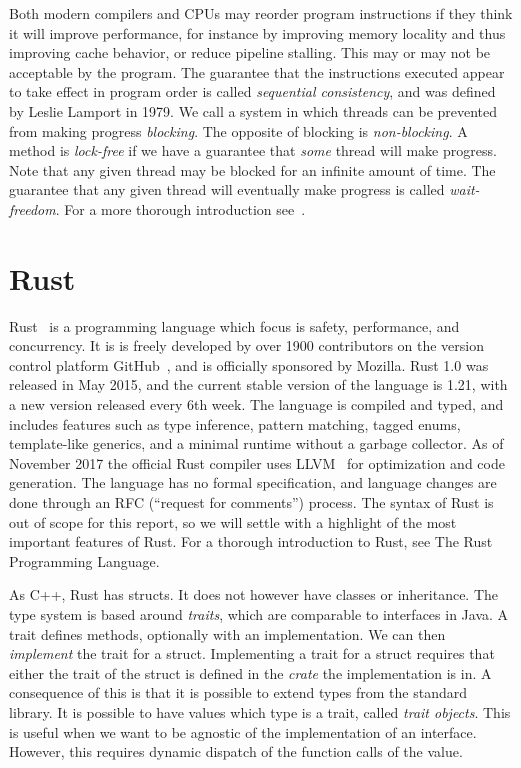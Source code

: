 \documentclass[b5paper]{report}
\begin{document}
Both modern compilers and CPUs may reorder program instructions if they think
it will improve performance, for instance by improving memory locality and thus
improving cache behavior, or reduce pipeline stalling. This may or may not be
acceptable by the program. The guarantee that the instructions executed appear
to take effect in program order is called \emph{sequential consistency}, and
was defined by Leslie Lamport in 1979. We call a system in
which threads can be prevented from making progress \emph{blocking}. The
opposite of blocking is \emph{non-blocking}. A method is \emph{lock-free} if we
have a guarantee that \emph{some} thread will make progress. Note that any given
thread may be blocked for an infinite amount of time. The guarantee that any
given thread will eventually make progress is called \emph{wait-freedom}.  For a
more thorough introduction see~\cite{herlihy2011art}.




\section{Rust}\label{sec:rust}

Rust~\cite{rust} is a programming language which focus is safety, performance,
and concurrency. It is is freely developed by over 1900 contributors on the
version control platform GitHub~\cite{github}, and is officially sponsored by
Mozilla. Rust 1.0 was released in May 2015, and the current stable version of
the language is 1.21, with a new version released every 6th week. The language
is compiled and typed, and includes features such as type inference, pattern
matching, tagged enums, template-like generics, and a minimal runtime without a
garbage collector. As of November 2017 the official Rust compiler 
uses LLVM~\cite{llvm} for optimization and code generation. The language has no
formal specification, and language changes are done through an RFC (``request
for comments'') process. The syntax of Rust is out of scope for this report, so
we will settle with a highlight of the most important features of Rust. For a
thorough introduction to Rust, see The Rust Programming Language\cite{trpl}.

As C++, Rust has structs. It does not however have classes or inheritance. The
type system is based around \emph{traits}, which are comparable to interfaces in
Java. A trait defines methods, optionally with an implementation. We can then
\emph{implement} the trait for a struct. Implementing a trait for a struct
requires that either the trait of the struct is defined in the \emph{crate} the
implementation is in. A consequence of this is that it is possible to extend
types from the standard library. It is possible to have values which type is a
trait, called \emph{trait objects}. This is useful when we want to be agnostic
of the implementation of an interface. However, this requires dynamic dispatch
of the function calls of the value.
\end{document}

